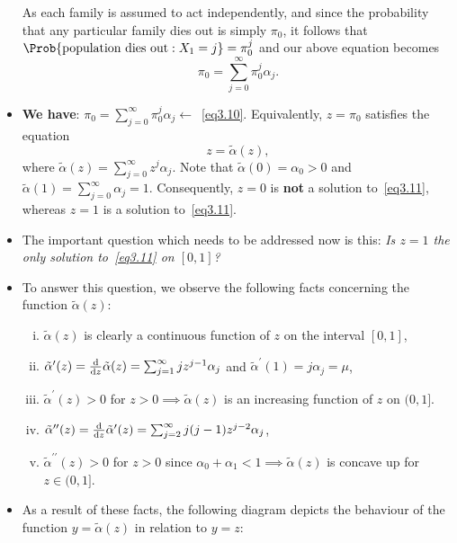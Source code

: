 \begin{itemize}
            As each family is assumed to act independently, and since the probability that any particular
            family dies out is simply $ \pi_0 $, it follows that $ \Prob{\text{population dies out}\given X_1=j}=\pi_0^j $ and our above
            equation becomes
            \[ \pi_0=\sum_{j=0}^{\infty} \pi_0^j \alpha_j.\label{eq3.10}\tag*{(3.10)} \]
      \item \textbf{We have}: $ \pi_0=\sum_{j=0}^{\infty} \pi_0^j \alpha_j \leftarrow $~\ref{eq3.10}. Equivalently, $ z=\pi_0 $ satisfies the equation
            \[ z=\tilde{\alpha}(z),\label{eq3.11}\tag*{(3.11)} \]
            where $ \tilde{\alpha}(z)=\sum_{j=0}^{\infty} z^j \alpha_j $. Note that $ \tilde{\alpha}(0)=\alpha_0>0 $ and $ \tilde{\alpha}(1)=\sum_{j=0}^{\infty} \alpha_j=1 $.
            Consequently, $ z=0 $ is \textbf{not} a solution to~\ref{eq3.11}, whereas $ z=1 $ is a solution to~\ref{eq3.11}.
      \item The important question which needs to be addressed now is this: \emph{Is $ z=1 $ the only solution to~\ref{eq3.11} on $ [0,1] $?}
      \item To answer this question, we observe the following facts concerning the function $ \tilde{\alpha}(z) $:
            \begin{enumerate}[(i)]
                  \item $ \tilde{\alpha}(z) $ is clearly a continuous function of $ z $ on the interval $ [0,1] $,
                  \item $ \tilde{\alpha}^\prime(z)=\odv*{\tilde{\alpha}(z)}{z}=\sum_{j=1}^{\infty} jz^{j-1}\alpha_j $ and $ \tilde{\alpha}^\prime(1)=j\alpha_j=\mu $,
                  \item $ \tilde{\alpha}^\prime(z)>0 $ for $ z>0\implies \tilde{\alpha}(z) $ is an increasing function of $ z $ on $ (0,1] $.%
                  \item $ \tilde{\alpha}^{\prime\prime}(z)=\odv*{\tilde{\alpha}^\prime(z)}{z}=\sum_{j=2}^{\infty} j(j-1)z^{j-2}\alpha_j $,
                  \item $ \tilde{\alpha}^{\prime\prime}(z)>0 $ for $ z>0 $ since $ \alpha_0+\alpha_1<1\implies \tilde{\alpha}(z) $ is concave up for $ z\in(0,1] $.%
            \end{enumerate}
      \item As a result of these facts, the following diagram depicts the behaviour of the function $ y=\tilde{\alpha}(z) $ in relation to $ y=z $:
            \begin{figure}[!htbp]

\end{figure}
\end{itemize}
